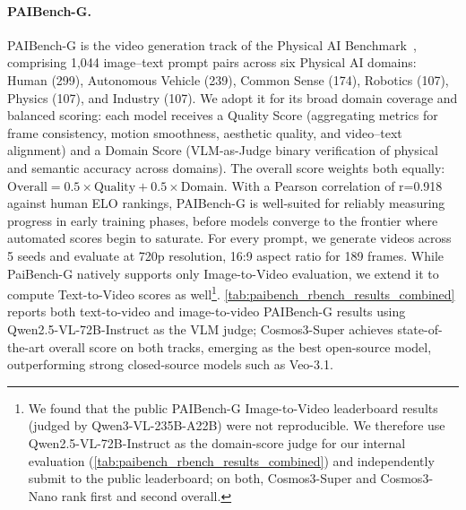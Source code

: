 \paragraph{PAIBench-G.} PAIBench-G is the video generation track of the Physical AI Benchmark~\citep{zhou2025paibench}, comprising 1,044 image–text prompt pairs across six Physical AI domains: Human (299), Autonomous Vehicle (239), Common Sense (174), Robotics (107), Physics (107), and Industry (107). We adopt it for its broad domain coverage and balanced scoring: each model receives a Quality Score (aggregating metrics for frame consistency, motion smoothness, aesthetic quality, and video–text alignment) and a Domain Score (VLM-as-Judge binary verification of physical and semantic accuracy across domains). The overall score weights both equally: $\text{Overall} = 0.5 \times \text{Quality} + 0.5 \times \text{Domain}$. With a Pearson correlation of
r=0.918 against human ELO rankings, PAIBench-G is well-suited for reliably measuring progress in early training phases, before models converge to the frontier where automated scores begin to saturate. For every prompt, we generate videos across 5 seeds and evaluate at 720p resolution, 16:9 aspect ratio for 189 frames. While PaiBench-G natively supports only Image-to-Video evaluation, we extend it to compute Text-to-Video scores as well\footnote{We found that the public PAIBench-G Image-to-Video leaderboard results (judged by Qwen3-VL-235B-A22B) were not reproducible. We therefore use Qwen2.5-VL-72B-Instruct as the domain-score judge for our internal evaluation (\cref{tab:paibench_rbench_results_combined}) and independently submit to the public leaderboard; on both, Cosmos3-Super and Cosmos3-Nano rank first and second overall.}. \cref{tab:paibench_rbench_results_combined} reports both text-to-video and image-to-video PAIBench-G results using Qwen2.5-VL-72B-Instruct as the VLM judge; Cosmos3-Super achieves state-of-the-art overall score on both tracks, emerging as the best open-source model, outperforming strong closed-source models such as Veo-3.1.



